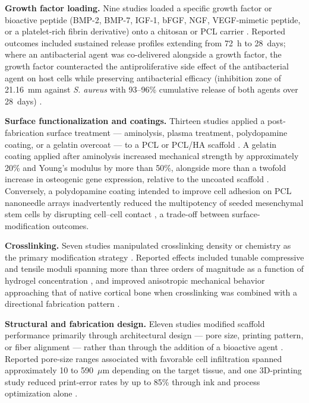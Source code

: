 \documentclass[5p,times,twocolumn]{elsarticle}
\begin{document}
\textbf{Growth factor loading.} Nine studies loaded a specific growth factor or bioactive peptide (BMP-2, BMP-7, IGF-1, bFGF, NGF, VEGF-mimetic peptide, or a platelet-rich fibrin derivative) onto a chitosan or PCL carrier \cite{ref7,ref8,ref10,ref25,ref42,ref72,ref75,ref76,ref77}. Reported outcomes included sustained release profiles extending from 72~h to 28~days; where an antibacterial agent was co-delivered alongside a growth factor, the growth factor counteracted the antiproliferative side effect of the antibacterial agent on host cells while preserving antibacterial efficacy (inhibition zone of 21.16~mm against \textit{S. aureus} with 93--96\% cumulative release of both agents over 28~days) \cite{ref25}.

\textbf{Surface functionalization and coatings.} Thirteen studies applied a post-fabrication surface treatment --- aminolysis, plasma treatment, polydopamine coating, or a gelatin overcoat --- to a PCL or PCL/HA scaffold \cite{ref18,ref25,ref26,ref46,ref53,ref54,ref55,ref60,ref68,ref72,ref73,ref76,ref77}. A gelatin coating applied after aminolysis increased mechanical strength by approximately 20\% and Young's modulus by more than 50\%, alongside more than a twofold increase in osteogenic gene expression, relative to the uncoated scaffold \cite{ref18}. Conversely, a polydopamine coating intended to improve cell adhesion on PCL nanoneedle arrays inadvertently reduced the multipotency of seeded mesenchymal stem cells by disrupting cell--cell contact \cite{ref60}, a trade-off between surface-modification outcomes.

\textbf{Crosslinking.} Seven studies manipulated crosslinking density or chemistry as the primary modification strategy \cite{ref1,ref5,ref12,ref16,ref18,ref54,ref61}. Reported effects included tunable compressive and tensile moduli spanning more than three orders of magnitude as a function of hydrogel concentration \cite{ref51}, and improved anisotropic mechanical behavior approaching that of native cortical bone when crosslinking was combined with a directional fabrication pattern \cite{ref1}.

\textbf{Structural and fabrication design.} Eleven studies modified scaffold performance primarily through architectural design --- pore size, printing pattern, or fiber alignment --- rather than through the addition of a bioactive agent \cite{ref1,ref11,ref16,ref17,ref32,ref39,ref40,ref45,ref62,ref63,ref71}. Reported pore-size ranges associated with favorable cell infiltration spanned approximately 10 to 590~$\mu$m depending on the target tissue, and one 3D-printing study reduced print-error rates by up to 85\% through ink and process optimization alone \cite{ref39}.
\end{document}
